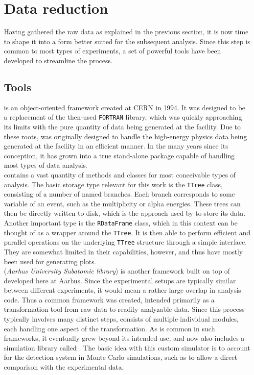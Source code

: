 \section{Data reduction} \label{section: data reduction}
Having gathered the raw data as explained in the previous section, it is now time to shape it into a form better suited for the subsequent analysis. Since this step is common to most types of experiments, a set of powerful tools have been developed to streamline the process.  

\subsection{Tools} \label{sec: datared: tools}
\ROOT{} \cite{ROOT} is an object-oriented \CPP{} framework created at CERN in 1994. It was designed to be a replacement of the then-used \texttt{FORTRAN} library, which was quickly approaching its limits with the pure quantity of data being generated at the facility. Due to these roots, \ROOT{} was originally designed to handle the high-energy physics data being generated at the facility in an efficient manner. In the many years since its conception, it has grown into a true stand-alone package capable of handling most types of data analysis. \\

\ROOT{} contains a vast quantity of methods and classes for most conceivable types of analysis. The basic storage type relevant for this work is the \texttt{TTree} class, consisting of a number of named branches. Each branch corresponds to some variable of an event, such as the multiplicity or alpha energies. These trees can then be directly written to disk, which is the approach used by \AUSAlib{} to store its data. \\

Another important type is the \texttt{RDataFrame} class, which in this context can be thought of as a wrapper around the \texttt{TTree}. It is then able to perform efficient and parallel operations on the underlying \texttt{TTree} structure through a simple interface. They are somewhat limited in their capabilities, however, and thus have mostly been used for generating plots. \\

\AUSAlib{} (\textit{Aarhus University Subatomic library}) \cite{AUSAlib} is another \CPP{} framework built on top of \ROOT{} developed here at Aarhus. Since the experimental setups are typically similar between different experiments, it would mean a rather large overlap in analysis code. Thus a common framework was created, intended primarily as a transformation tool from raw data to readily analyzable data. Since this process typically involves many distinct steps, \AUSAlib{} consists of multiple individual modules, each handling one aspect of the transformation. As is common in such frameworks, it eventually grew beyond its intended use, and now also includes a simulation library called \simX{}. The basic idea with this custom simulator is to account for the detection system in Monte Carlo simulations, such as to allow a direct comparison with the experimental data. \\

